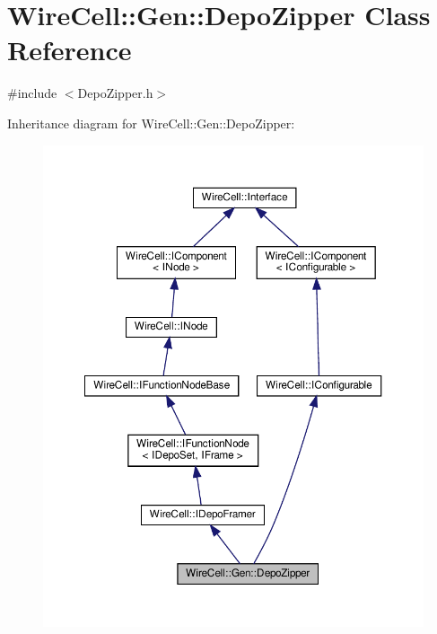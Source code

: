 \hypertarget{class_wire_cell_1_1_gen_1_1_depo_zipper}{}\section{Wire\+Cell\+:\+:Gen\+:\+:Depo\+Zipper Class Reference}
\label{class_wire_cell_1_1_gen_1_1_depo_zipper}


{\ttfamily \#include $<$Depo\+Zipper.\+h$>$}



Inheritance diagram for Wire\+Cell\+:\+:Gen\+:\+:Depo\+Zipper\+:
\nopagebreak
\begin{figure}[H]
\begin{center}
\leavevmode
\includegraphics[width=350pt]{class_wire_cell_1_1_gen_1_1_depo_zipper__inherit__graph}
\end{center}
\end{figure}


